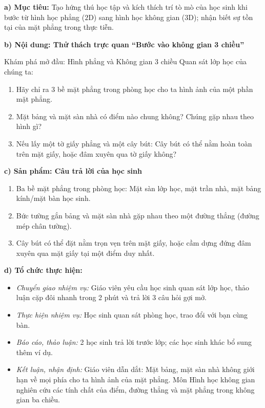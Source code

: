 \documentclass[12pt, a4paper]{article}
\begin{document}
\noindent \textbf{a) Mục tiêu:}
Tạo hứng thú học tập và kích thích trí tò mò của học sinh khi bước từ hình học phẳng ($2\text{D}$) sang hình học không gian ($3\text{D}$); nhận biết sự tồn tại của mặt phẳng trong thực tiễn.

\noindent \textbf{b) Nội dung: Thử thách trực quan ``Bước vào không gian 3 chiều''}
\begin{pedabox}{Khám phá mở đầu: Hình phẳng và Không gian 3 chiều}
Quan sát lớp học của chúng ta:
\begin{enumerate}[leftmargin=0.6cm]
    \item Hãy chỉ ra 3 bề mặt phẳng trong phòng học cho ta hình ảnh của một phần mặt phẳng.
    \item Mặt bảng và mặt sàn nhà có điểm nào chung không? Chúng gặp nhau theo hình gì?
    \item Nếu lấy một tờ giấy phẳng và một cây bút: Cây bút có thể nằm hoàn toàn trên mặt giấy, hoặc đâm xuyên qua tờ giấy không?
\end{enumerate}
\end{pedabox}

\noindent \textbf{c) Sản phẩm: Câu trả lời của học sinh}
\begin{enumerate}[leftmargin=0.6cm]
    \item Ba bề mặt phẳng trong phòng học: Mặt sàn lớp học, mặt trần nhà, mặt bảng kính/mặt bàn học sinh.
    \item Bức tường gắn bảng và mặt sàn nhà gặp nhau theo một đường thẳng (đường mép chân tường).
    \item Cây bút có thể đặt nằm trọn vẹn trên mặt giấy, hoặc cầm dựng đứng đâm xuyên qua mặt giấy tại một điểm duy nhất.
\end{enumerate}

\noindent \textbf{d) Tổ chức thực hiện:}
\begin{itemize}[leftmargin=0.8cm]
    \item \textit{Chuyển giao nhiệm vụ:} Giáo viên yêu cầu học sinh quan sát lớp học, thảo luận cặp đôi nhanh trong 2 phút và trả lời 3 câu hỏi gợi mở.
    \item \textit{Thực hiện nhiệm vụ:} Học sinh quan sát phòng học, trao đổi với bạn cùng bàn.
    \item \textit{Báo cáo, thảo luận:} 2 học sinh trả lời trước lớp; các học sinh khác bổ sung thêm ví dụ.
    \item \textit{Kết luận, nhận định:} Giáo viên dẫn dắt: Mặt bảng, mặt sàn nhà không giới hạn về mọi phía cho ta hình ảnh của mặt phẳng. Môn Hình học không gian nghiên cứu các tính chất của điểm, đường thẳng và mặt phẳng trong không gian ba chiều.
\end{itemize}
\end{document}
